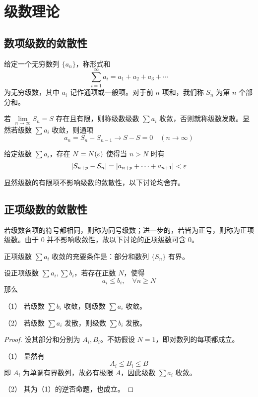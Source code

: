 \chapter{级数理论}

\section{数项级数的敛散性}

给定一个无穷数列 $\{a_n\}$，称形式和
\[ \sum_{i=1}^\infty a_i = a_1 + a_2 + a_3 + \cdots \]
为无穷级数，其中 $a_i$ 记作通项或一般项。对于前 $n$ 项和，我们称 $S_n$ 为第 $n$ 个部分和。

若 $\lim\limits_{n \to \infty} S_n = S$ 存在且有限，则称级数级数 $\sum a_i$ 收敛，否则就称级数发散。显然若级数 $\sum a_i$ 收敛，则通项
\[ a_n = S_n - S_{n-1} \to S - S = 0 \quad(n \to \infty) \]

\begin{theorem}[Cauchy 准则]
	给定级数 $\sum a_i$，存在 $N = N(\varepsilon)$ 使得当 $n > N$ 时有
	\[ |S_{n+p} - S_{n}| = |a_{n+p} + \cdots + a_{n+1}| < \varepsilon \]
\end{theorem}

显然级数的有限项不影响级数的敛散性，以下讨论均舍弃。

\section{正项级数的敛散性}

若级数各项的符号都相同，则称为同号级数；进一步的，若皆为正号，则称为正项级数。由于 $0$ 并不影响收敛性，故以下讨论的正项级数可含 $0$。

\begin{theorem}[基本判别法]
	正项级数 $\sum a_i$ 收敛的充要条件是：部分和数列 $\{S_n\}$ 有界。
\end{theorem}

\begin{theorem}[比较原则]
	设正项级数 $\sum a_i, \sum b_i$，若存在正数 $N$，使得
	\[ a_i \leqslant b_i, \quad \forall n \geqslant N \]
	那么
	
	（1） 若级数 $\sum b_i$ 收敛，则级数 $\sum a_i$ 收敛。
	
	（2） 若级数 $\sum a_i$ 发散，则级数 $\sum b_i$ 发散。
\end{theorem}

\begin{proof}
	设其部分和分别为 $A_i, B_i$。不妨假设 $N=1$，即对数列的每项都成立。
	
	（1） 显然有
	\[ A_i \leqslant B_i \leqslant B \]
	即 $A_i$ 为单调有界数列，故必有极限 $A$，因此级数 $\sum a_i$ 收敛。
	
	（2） 其为（1）的逆否命题，也成立。
\end{proof}


